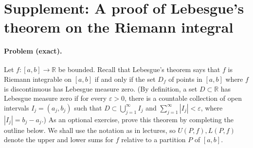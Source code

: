 \documentclass[12pt,a4paper]{article}
\theoremstyle{plain}
\theoremstyle{definition}
\theoremstyle{remark}
\theoremstyle{remark}
\begin{document}
\section*{Supplement: A proof of Lebesgue's theorem on the Riemann integral}

\paragraph{Problem (exact).}
Let $f:[a,b]\to\mathbb{R}$ be bounded. Recall that Lebesgue's theorem says that $f$ is Riemann integrable on $[a,b]$ if and only if the set $D_f$ of points in $[a,b]$ where $f$ is discontinuous has Lebesgue measure zero. (By definition, a set $D\subset\mathbb{R}$ has Lebesgue measure zero if for every $\varepsilon>0$, there is a countable collection of open intervals $I_j=(a_j,b_j)$ such that $D\subset\bigcup_{j=1}^\infty I_j$ and $\sum_{j=1}^\infty |I_j|<\varepsilon$, where $|I_j|=b_j-a_j$.) As an optional exercise, prove this theorem by completing the outline below. We shall use the notation as in lectures, so $U(P,f),L(P,f)$ denote the upper and lower sums for $f$ relative to a partition $P$ of $[a,b]$.
\end{document}
